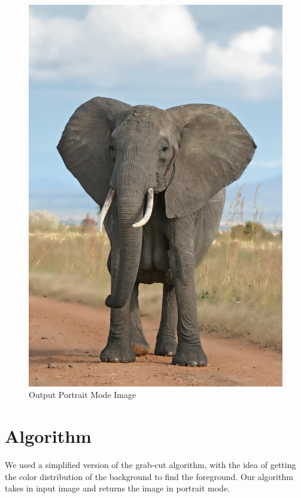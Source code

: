 \documentclass[12pt]{article}
\begin{document}
\begin{figure}[!htb]
\begin{minipage}{0.48\textwidth}
        \includegraphics[width=0.9\linewidth]{large_elephant_portrait.jpg}
        \caption{Output Portrait Mode Image}
    \end{minipage}\hfill
\end{figure}

\section{Algorithm}

We used a simplified version of the grab-cut algorithm, with the idea of getting
the color distribution of the background to find the foreground.
Our algorithm takes in input image and returns the image in portrait mode.
\end{document}
